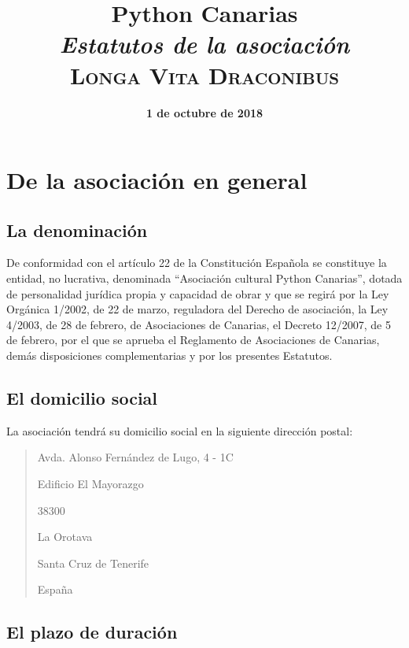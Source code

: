 \documentclass[a4paper, 12pt, oneside]{book}
\title{
    \huge \textbf{Python Canarias} \\
    \textit{Estatutos de la asociación} \\
    \vspace{1cm}
    \large \textsc{Longa Vita Draconibus}
}
\date{\textbf{1 de octubre de 2018}}
\author{}
\begin{document}
\maketitle

\tableofcontents

\chapter{De la asociación en general}

\section{La denominación}

De conformidad con el artículo 22 de la Constitución Española se constituye la entidad, no lucrativa, denominada ``Asociación cultural Python Canarias'', dotada de personalidad jurídica propia y capacidad de obrar y que se regirá por la Ley Orgánica 1/2002, de 22 de marzo, reguladora del Derecho de asociación, la Ley 4/2003, de 28 de febrero, de Asociaciones de Canarias, el Decreto 12/2007, de 5 de febrero, por el que se aprueba el Reglamento de Asociaciones de Canarias, demás disposiciones complementarias y por los presentes Estatutos.

\section{El domicilio social}

La asociación tendrá su domicilio social en la siguiente dirección postal:

\begin{quotation}

    Avda. Alonso Fernández de Lugo, 4 - 1C

    Edificio El Mayorazgo

    38300

    La Orotava

    Santa Cruz de Tenerife

    España





\end{quotation}

\section{El plazo de duración}
\end{document}
